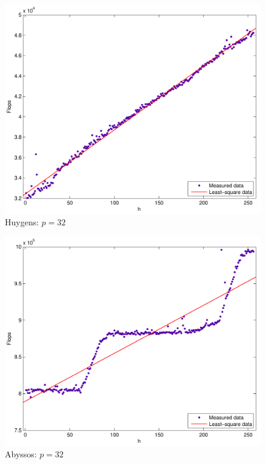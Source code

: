 \documentclass[a4paper,11pt]{article}
\begin{document}
\begin{figure}[H]
\begin{center}
\includegraphics[scale=0.6]{img/32-put}
\end{center}
\caption{Huygens: $p=32$}\label{huy:32}
\end{figure}

\begin{figure}[H]
\begin{center}
\includegraphics[scale=0.6]{img/abyssos-32-put}
\end{center}
\caption{Abyssos: $p=32$} \label{aby:32}
\end{figure}
\end{document}
